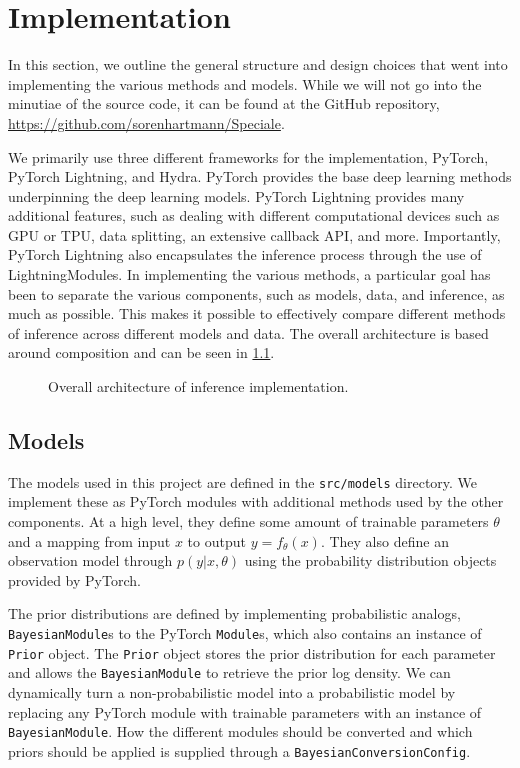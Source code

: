 \chapter{Implementation}


In this section, we outline the general structure and design choices that went into implementing the various methods and models. 
While we will not go into the minutiae of the source code, it can be found at the GitHub repository, \url{https://github.com/sorenhartmann/Speciale}.

We primarily use three different frameworks for the implementation, PyTorch, PyTorch Lightning, and Hydra.
PyTorch provides the base deep learning methods underpinning the deep learning models. 
PyTorch Lightning provides many additional features, such as dealing with different computational devices such as GPU or TPU, data splitting, an extensive callback API, and more.
Importantly, PyTorch Lightning also encapsulates the inference process through the use of LightningModules.
In implementing the various methods, a particular goal has been to separate the various components, such as models, data, and inference, as much as possible.  
This makes it possible to effectively compare different methods of inference across different models and data.
The overall architecture is based around composition and can be seen in \cref{fig:sw-arch}.
\begin{figure}[htbp]
    \centering
    
    \caption{Overall architecture of inference implementation. }
    \label{fig:sw-arch}
\end{figure}

\section{Models}
The models used in this project are defined in the \texttt{src/models} directory.
We implement these as PyTorch modules with additional methods used by the other components. 
At a high level, they define some amount of trainable parameters $\theta$ and a mapping from input $x$ to output $y=f_\theta(x)$. 
They also define an observation model through $p(y|x, \theta)$ using the probability distribution objects provided by PyTorch.

The prior distributions are defined by implementing probabilistic analogs, \texttt{BayesianModule}s to the PyTorch \texttt{Module}s, which also contains an instance of \texttt{Prior} object. 
The \texttt{Prior} object stores the prior distribution for each parameter and allows the \texttt{BayesianModule} to retrieve the prior log density. 
We can dynamically turn a non-probabilistic model into a probabilistic model by replacing any PyTorch module with trainable parameters with an instance of \texttt{BayesianModule}.
How the different modules should be converted and which priors should be applied is supplied through a \texttt{BayesianConversionConfig}.

